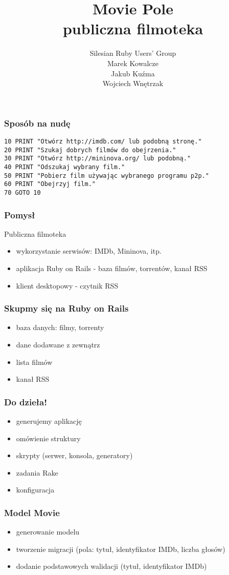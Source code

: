 \documentclass[12t]{beamer}
\author{Silesian Ruby Users' Group \\[10pt]
  \footnotesize{Marek Kowalcze \\
    Jakub Kuźma \\
    Wojciech Wnętrzak}}
\title{Movie Pole \\ publiczna filmoteka}
\begin{document}
\frame{\titlepage}


\begin{frame}[fragile]
  \frametitle{Sposób na nudę}
\begin{verbatim}
10 PRINT "Otwórz http://imdb.com/ lub podobną stronę."
20 PRINT "Szukaj dobrych filmów do obejrzenia."
30 PRINT "Otwórz http://mininova.org/ lub podobną."
40 PRINT "Odszukaj wybrany film."
50 PRINT "Pobierz film używając wybranego programu p2p."
60 PRINT "Obejrzyj film."
70 GOTO 10
\end{verbatim}
\end{frame}

\begin{frame}
  \frametitle{Pomysł}
  Publiczna filmoteka
  \begin{itemize}
  \item wykorzystanie serwisów: IMDb, Mininova, itp.
  \item aplikacja Ruby on Rails - baza filmów, torrentów, kanał RSS
  \item klient desktopowy - czytnik RSS
  \end{itemize}
\end{frame}

\begin{frame}
  \frametitle{Skupmy się na Ruby on Rails}
  \begin{itemize}
  \item baza danych: filmy, torrenty
  \item dane dodawane z zewnątrz
  \item lista filmów
  \item kanał RSS
  \end{itemize}
\end{frame}

\begin{frame}
  \frametitle{Do dzieła!}
  \begin{itemize}
  \item generujemy aplikację
  \item omówienie struktury
  \item skrypty (serwer, konsola, generatory)
  \item zadania Rake
  \item konfiguracja
  \end{itemize}
\end{frame}

\begin{frame}
  \frametitle{Model Movie}
  \begin{itemize}
  \item generowanie modelu
  \item tworzenie migracji (pola: tytuł, identyfikator IMDb, liczba
    głosów)
  \item dodanie podstawowych walidacji (tytuł, identyfikator IMDb)
  \end{itemize}
\end{frame}
\end{document}
